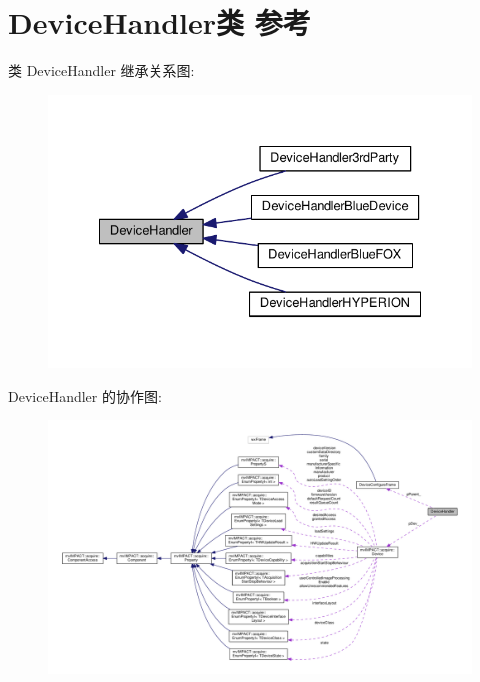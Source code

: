 \hypertarget{class_device_handler}{\section{Device\+Handler类 参考}
\label{class_device_handler}
}


类 Device\+Handler 继承关系图\+:
\nopagebreak
\begin{figure}[H]
\begin{center}
\leavevmode
\includegraphics[width=332pt]{class_device_handler__inherit__graph}
\end{center}
\end{figure}


Device\+Handler 的协作图\+:
\nopagebreak
\begin{figure}[H]
\begin{center}
\leavevmode
\includegraphics[width=350pt]{class_device_handler__coll__graph}
\end{center}
\end{figure}
